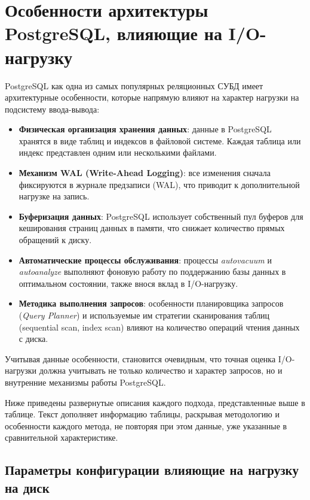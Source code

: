 \section{Особенности архитектуры PostgreSQL, влияющие на I/O-нагрузку}

PostgreSQL как одна из самых популярных реляционных СУБД имеет архитектурные особенности, которые напрямую влияют на характер нагрузки на подсистему ввода-вывода:

\begin{itemize}
    \item \textbf{Физическая организация хранения данных}: данные в PostgreSQL хранятся в виде таблиц и индексов в файловой системе. Каждая таблица или индекс представлен одним или несколькими файлами.
    \item \textbf{Механизм WAL (Write-Ahead Logging)}: все изменения сначала фиксируются в журнале предзаписи (WAL), что приводит к дополнительной нагрузке на запись.
    \item \textbf{Буферизация данных}: PostgreSQL использует собственный пул буферов для кеширования страниц данных в памяти, что снижает количество прямых обращений к диску.
    \item \textbf{Автоматические процессы обслуживания}: процессы \textit{autovacuum} и \textit{autoanalyze} выполняют фоновую работу по поддержанию базы данных в оптимальном состоянии, также внося вклад в I/O-нагрузку.
    \item \textbf{Методика выполнения запросов}: особенности планировщика запросов (\textit{Query Planner}) и используемые им стратегии сканирования таблиц (sequential scan, index scan) влияют на количество операций чтения данных с диска.
\end{itemize}

Учитывая данные особенности, становится очевидным, что точная оценка I/O-нагрузки должна учитывать не только количество и 
характер запросов, но и внутренние механизмы работы PostgreSQL.

Ниже приведены развернутые описания каждого подхода, представленные выше в таблице. Текст дополняет информацию таблицы, 
раскрывая методологию и особенности каждого метода, не повторяя при этом данные, уже указанные в сравнительной характеристике.


\subsection{Параметры конфигурации влияющие на нагрузку на диск}

